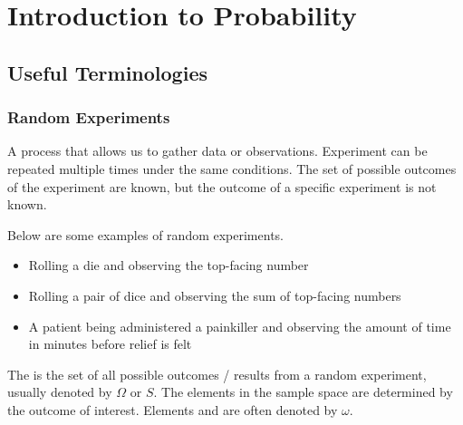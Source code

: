 \chapter{Introduction to Probability}

\section{Useful Terminologies}

\subsection{Random Experiments}

\begin{definition}
    A process that allows us to gather data or observations. Experiment can be repeated multiple times under the same conditions. The set of possible outcomes of the experiment are known, but the outcome of a specific experiment is not known.
\end{definition}

\begin{example}
    Below are some examples of random experiments. 

    \begin{itemize}
        \item Rolling a die and observing the top-facing number 
        \item Rolling a pair of dice and observing the sum of top-facing numbers 
        \item A patient being administered a painkiller and observing the amount of time in minutes before relief is felt
    \end{itemize}
\end{example}

\begin{definition}
    The  is the set of all possible outcomes / results from a random experiment, usually denoted by $\Omega$ or $S$. The elements in the sample space are determined by the outcome of interest. Elements and are often denoted by $\omega$.
\end{definition}

